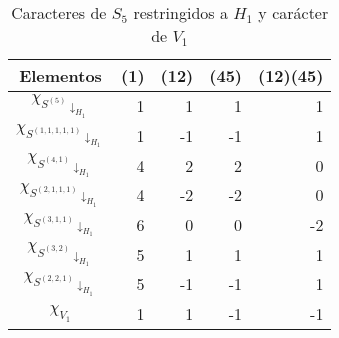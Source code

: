 \documentclass[12pt]{book}
\theoremstyle{definition}
\newcounter{in}
\begin{document}
\begin{table}[!hbtp]
  \centering
  \begin{tabular}{c |r r r r}
    Elementos & (1) & (12) & (45) & (12)(45) \\
    \hline
    $\chi_{S^{(5)}\downarrow_{H_{1}}}$ & 1 & 1  & 1  & 1 \\
    $\chi_{S^{(1,1,1,1,1)}\downarrow_{H_{1}}}$ & 1 & -1 & -1 & 1  \\
    $\chi_{S^{(4,1)}\downarrow_{H_{1}}}$ & 4 & 2  & 2  & 0  \\
    $\chi_{S^{(2,1,1,1)}\downarrow_{H_{1}}}$ & 4 & -2 & -2 & 0  \\
    $\chi_{S^{(3,1,1)}\downarrow_{H_{1}}}$ & 6 & 0  & 0  & -2 \\
    $\chi_{S^{(3,2)}\downarrow_{H_{1}}}$ & 5 & 1  & 1  & 1  \\
    $\chi_{S^{(2,2,1)}\downarrow_{H_{1}}}$ & 5 & -1 & -1 & 1  \\
    \hline
    $\chi_{V_{1}}$ & 1 & 1 & -1 & -1 \\
  \end{tabular}

  \caption{Caracteres de $S_{5}$ restringidos a $H_{1}$ y carácter de $V_{1}$}
  \label{tab:clanes-H_1-5}
\end{table}
\end{document}
